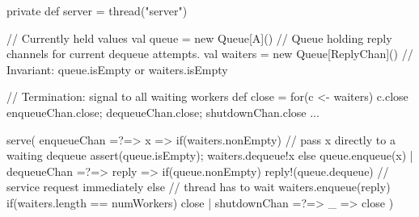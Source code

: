 
\begin{slide}

\begin{scala}
  private def server = thread("server"){
    // Currently held values
    val queue = new Queue[A]()
    // Queue holding reply channels for current dequeue attempts.
    val waiters = new Queue[ReplyChan]()
    // Invariant: queue.isEmpty or waiters.isEmpty

    // Termination: signal to all waiting workers
    def close = {
      for(c <- waiters) c.close
      enqueueChan.close; dequeueChan.close; shutdownChan.close
    }
    ...
  }
\end{scala}
\end{slide}


\begin{slide}

\begin{scala}
    serve(
      enqueueChan =?=> { x => 
        if(waiters.nonEmpty){ // pass x directly to a waiting dequeue
          assert(queue.isEmpty); waiters.dequeue!x
        }
        else queue.enqueue(x)
      }
      | dequeueChan =?=> { reply =>
          if(queue.nonEmpty) reply!(queue.dequeue) // service request immediately
          else{                                        // thread has to wait
            waiters.enqueue(reply)
            if(waiters.length == numWorkers) close
          }
        }
      | shutdownChan =?=> { _ => close }
    )
\end{scala}
\end{slide}
